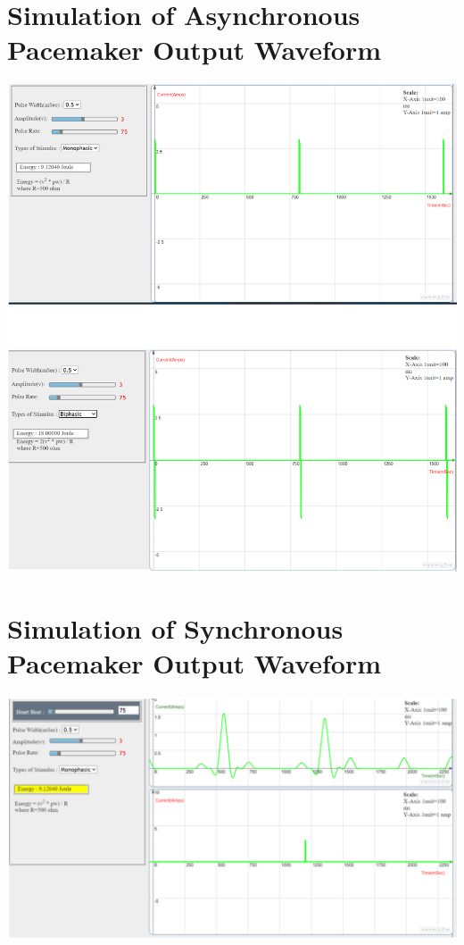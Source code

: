 \documentclass[
  11pt,
  letterpaper,
  DIV=11,
  numbers=noendperiod]{scrreprt}
\begin{document}
\section{Simulation of Asynchronous Pacemaker Output
Waveform}\label{simulation-of-asynchronous-pacemaker-output-waveform}

\begin{center}
\includegraphics[width=6.07292in,height=\textheight]{images/clipboard-243054570.png}
\end{center}

\section{Simulation of Synchronous Pacemaker Output
Waveform}\label{simulation-of-synchronous-pacemaker-output-waveform}

\begin{center}
\includegraphics{images/clipboard-3780312789.png}
\end{center}
\end{document}
